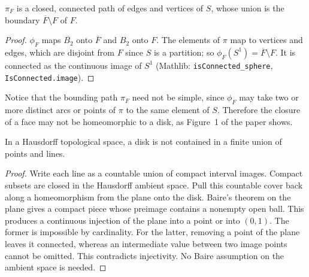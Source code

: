     \begin{lemma}\label{lem:face-boundary}
      \leanok
      $\pi_F$ is a closed, connected path of edges and vertices of $S$, whose
      union is the boundary $\overline{F} \setminus F$ of $F$.
    \end{lemma}
    \begin{proof}
      \leanok
      $\phi_F$ maps $\overline{B_2}$ onto $\overline{F}$ and $B_2$ onto $F$.
      The elements of $\pi$ map to vertices and edges, which are disjoint
      from $F$ since $S$ is a partition; so
      $\phi_F(S^1) = \overline{F} \setminus F$. It is connected as the
      continuous image of $S^1$ (Mathlib: \texttt{isConnected\_sphere},
      \texttt{IsConnected.image}).
    \end{proof}

    Notice that the bounding path $\pi_F$ need not be simple, since $\phi_F$
    may take two or more distinct arcs or points of $\pi$ to the same element
    of $S$. Therefore the closure of a face may not be homeomorphic to a
    disk, as Figure~1 of the paper shows.

    \begin{lemma}\label{lem:no-finite-cover}

      In a Hausdorff topological space, a disk is not contained in a finite
      union of points and lines.
    \end{lemma}
    \begin{proof}

      Write each line as a countable union of compact interval images.
      Compact subsets are closed in the Hausdorff ambient space. Pull this
      countable cover back along a homeomorphism from the plane onto the
      disk. Baire's theorem on the plane gives a compact piece whose
      preimage contains a nonempty open ball. This produces a continuous
      injection of the plane into a point or into $(0,1)$. The former is
      impossible by cardinality. For the latter, removing a point of the
      plane leaves it connected, whereas an intermediate value between
      two image points cannot be omitted. This contradicts injectivity.
      No Baire assumption on the ambient space is needed.
    \end{proof}


